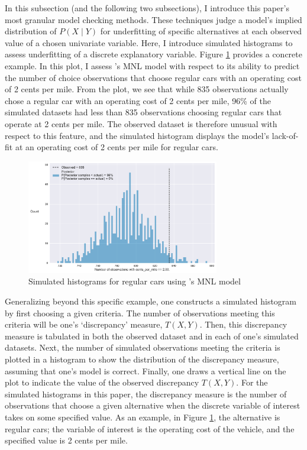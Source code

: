 \documentclass[preprint]{elsarticle}
\begin{document}
In this subsection (and the following two subsections), I introduce this paper's most granular model checking methods. These techniques judge a model's implied distribution of $P \left( X \mid Y \right)$ for underfitting of specific alternatives at each observed value of a chosen univariate variable. Here, I introduce simulated histograms to assess underfitting of a discrete explanatory variable. Figure \ref{fig:orig-mnl-regcar-histogram} provides a concrete example. In this plot, I assess \citeauthor{brownstone_forecasting_1998}'s MNL model with respect to its ability to predict the number of choice observations that choose regular cars with an operating cost of 2 cents per mile. From the plot, we see that while 835 observations actually chose a regular car with an operating cost of 2 cents per mile, 96\% of the simulated datasets had less than 835 observations choosing regular cars that operate at 2 cents per mile. The observed dataset is therefore unusual with respect to this feature, and the simulated histogram displays the model's lack-of-fit at an operating cost of 2 cents per mile for regular cars.

\begin{figure}
\centering
\includegraphics[width=0.75\textwidth]{histogram-vehicle-choice-mnl-regcar-operating-costs}
\caption{Simulated histograms for regular cars using \citeauthor{brownstone_forecasting_1998}'s MNL model}
\label{fig:orig-mnl-regcar-histogram}
\end{figure}

Generalizing beyond this specific example, one constructs a simulated histogram by first choosing a given criteria. The number of observations meeting this criteria will be one's `discrepancy' measure, $T \left( X, Y \right)$. Then, this discrepancy measure is tabulated in both the observed dataset and in each of one's simulated datasets. Next, the number of simulated observations meeting the criteria is plotted in a histogram to show the distribution of the discrepancy measure, assuming that one's model is correct. Finally, one draws a vertical line on the plot to indicate the value of the observed discrepancy $T \left( X, Y \right)$. For the simulated histograms in this paper, the discrepancy measure is the number of observations that choose a given alternative when the discrete variable of interest takes on some specified value. As an example, in Figure \ref{fig:orig-mnl-regcar-histogram}, the alternative is regular cars; the variable of interest is the operating cost of the vehicle, and the specified value is 2 cents per mile.
\end{document}
